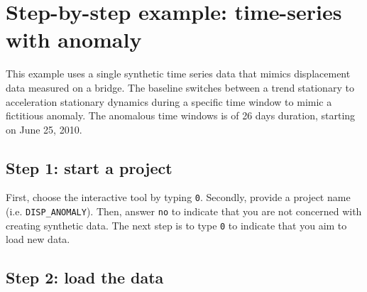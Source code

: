 \section{Step-by-step example: time-series with anomaly}
\label{S:ExampleDispAnomaly}

This example uses a single synthetic time series data that mimics displacement data measured on a bridge. 
The baseline switches between a trend stationary to acceleration stationary dynamics during a specific time window to mimic a fictitious anomaly.
The anomalous time windows is of 26 days duration, starting on June 25, 2010.


\subsection{Step 1: start a project}

First, choose the interactive tool by typing \colorbox{light-gray}{\lstinline[basicstyle = \mlttfamily \small, backgroundcolor = \color{light-gray}]!0!}.
Secondly, provide a project name (i.e. \lstinline[basicstyle = \mlttfamily \small, backgroundcolor = \color{light-gray}]!DISP_ANOMALY!).
Then, answer \colorbox{light-gray}{\lstinline[basicstyle = \mlttfamily \small, backgroundcolor = \color{light-gray}]!no!} to indicate that you are not concerned with creating synthetic data.
The next step is to type \colorbox{light-gray}{\lstinline[basicstyle = \mlttfamily \small, backgroundcolor = \color{light-gray}]!0!} to indicate that you aim to load new data.


\subsection{Step 2: load the data}

